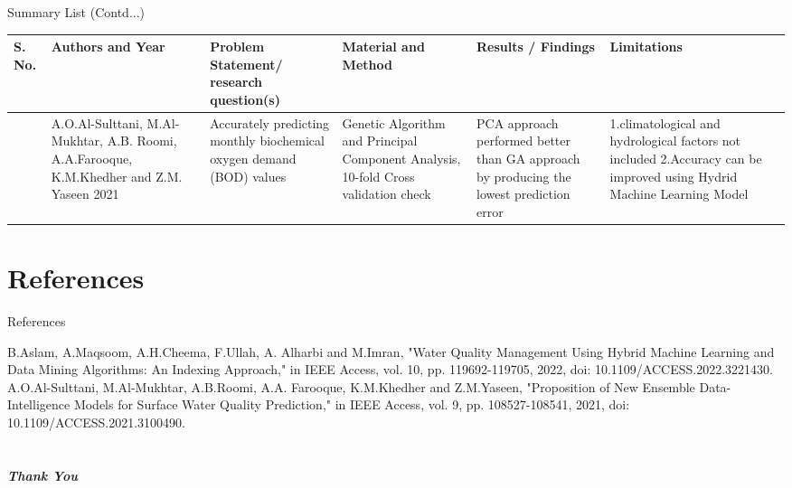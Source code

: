\documentclass[11pt]{beamer}
\begin{document}
\begin{frame}{Summary List (Contd...)}
        \centering
        \scriptsize \begin{tabular}{|p{0.3cm}|p{1.2cm}|p{1.7cm}|p{1.2cm}|p{1.7cm}|p{2cm}|}
        \hline
             \textbf{S. No.} & \textbf{Authors and Year}  &\textbf{Problem Statement/ research question(s)}  & \textbf{Material and Method}  & \textbf{Results} / Findings & \textbf{Limitations } \\ 
             \hline
            \cite{2} & A.O.Al-Sulttani, M.Al-Mukhtar, A.B. Roomi, A.A.Farooque, K.M.Khedher and Z.M. Yaseen 2021 & Accurately predicting monthly biochemical oxygen demand (BOD) values & Genetic Algorithm and Principal Component Analysis, 10-fold Cross validation check & PCA approach performed better than GA approach by producing the lowest prediction error & 1.climatological and hydrological factors not included 2.Accuracy can be improved using Hydrid Machine Learning Model \\
             \hline
        \end{tabular}

        \label{tab:sum_list}

\end{frame}


\section{References}
\begin{frame}{References}
    \tiny{\begin{thebibliography}{20}
    B.Aslam, A.Maqsoom, A.H.Cheema, F.Ullah, A. Alharbi and M.Imran, "Water Quality Management Using Hybrid Machine Learning and Data Mining Algorithms: An Indexing Approach," in IEEE Access, vol. 10, pp. 119692-119705, 2022, doi: 10.1109/ACCESS.2022.3221430.
    A.O.Al-Sulttani, M.Al-Mukhtar, A.B.Roomi, A.A. Farooque, K.M.Khedher and Z.M.Yaseen, "Proposition of New Ensemble Data-Intelligence Models for Surface Water Quality Prediction," in IEEE Access, vol. 9, pp. 108527-108541, 2021, doi: 10.1109/ACCESS.2021.3100490.

    \end{thebibliography}}
 \end{frame}
 
 \section{}
 \begin{frame}{}
  \centering \Huge
  \emph{\textbf{\textit{Thank You}}}
\end{frame}
\end{document}
